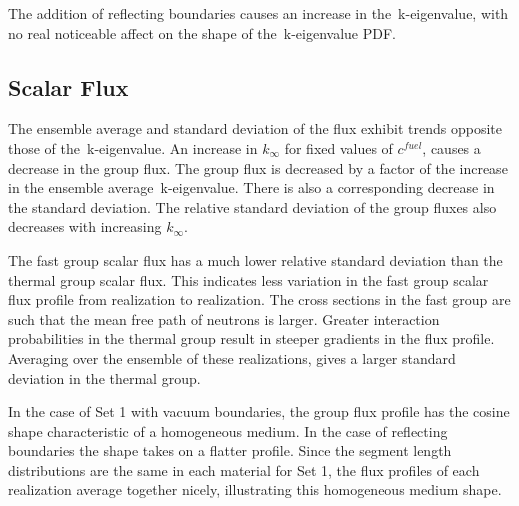 \noindent
	\indent The addition of reflecting boundaries causes an increase in
	the~k-eigenvalue, with no real noticeable affect on the shape of the~k-eigenvalue PDF.

\belowSubSecSkip

\subsection{Scalar Flux}
\label{sec:Conclusions-flux}

\noindent
	\indent The ensemble average and standard deviation of the flux exhibit trends
	opposite those of the~k-eigenvalue.  An increase in ${k_{\infty}}$ for fixed values of ${c^{fuel}}$,
	causes a decrease in the group flux.  The group flux is
	decreased by a factor of the increase in the ensemble average~k-eigenvalue.  There is
	also a corresponding decrease in the standard deviation.  The relative standard deviation
	of the group fluxes also decreases with increasing ${k_{\infty}}$.
	
\noindent
	\indent The fast group scalar flux has a much lower relative standard deviation 
	than the thermal group scalar flux.  This indicates less variation in the fast group
	scalar flux profile from realization to realization.  The cross sections in the fast group are
	such that the mean free path of neutrons is larger.  Greater interaction probabilities in the
	thermal group result in steeper gradients in the flux profile.  Averaging over the
	ensemble of these realizations, gives a larger standard deviation in the thermal group.
	
\noindent
	\indent In the case of Set 1 with vacuum boundaries, the group flux profile has the
	cosine shape characteristic of a homogeneous medium.  In the case of reflecting
	boundaries the shape takes on a flatter profile.  Since the segment length distributions
	are the same in each material for Set 1, the flux profiles of each realization average 
	together nicely, illustrating this homogeneous medium shape.
	
